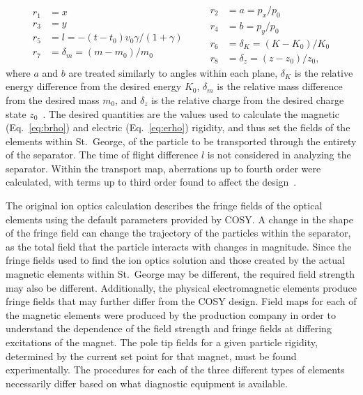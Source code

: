 \begin{equation}
    \label{eq:cosyvars}
    \begin{split}
        r_1 &= x \\
        r_3 &= y \\
        r_5 &= l = -(t - t_0)v_0\gamma/(1 + \gamma) \\
        r_7 &= \delta_m = (m - m_0)/m_0
    \end{split}
    \quad\quad
    \begin{split}
        r_2 &= a = p_x/p_0 \\
        r_4 &= b = p_y/p_0 \\
        r_6 &= \delta_K = (K - K_0)/K_0\\
        r_8 &= \delta_z = (z - z_0)/z_0,
    \end{split}
\end{equation}
where $a$ and $b$ are treated similarly to angles within each plane,
$\delta_K$ is the relative energy difference from the desired energy
$K_0$, $\delta_m$ is the relative mass difference from the desired mass
$m_0$, and $\delta_z$ is the relative charge from the desired charge
state $z_0$~\cite{COSY}. The desired quantities are the values used to
calculate the magnetic (Eq.~\ref{eq:brho}) and electric
(Eq.~\ref{eq:erho}) rigidity, and thus set the fields of the elements
within St.\ George, of the particle to be transported through the
entirety of the separator. The time of flight difference $l$ is not
considered in analyzing the separator. Within the transport map,
aberrations up to fourth order were calculated, with terms up to third
order found to affect the design~\cite{Couder2008}.

The original ion optics calculation describes the fringe fields of the
optical elements using the default parameters provided by COSY. A change
in the shape of the fringe field can change the trajectory of the
particles within the separator, as the total field that the particle
interacts with changes in magnitude. Since the fringe fields used to
find the ion optics solution and those created by the actual magnetic
elements within St.\ George may be different, the required field
strength may also be different. Additionally, the physical
electromagnetic elements produce fringe fields that may further differ
from the COSY design. Field maps for each of the magnetic elements were
produced by the production company in order to understand the dependence
of the field strength and fringe fields at differing excitations of the
magnet. The pole tip fields for a given particle rigidity, determined by
the current set point for that magnet, must be found experimentally. The
procedures for each of the three different types of elements necessarily
differ based on what diagnostic equipment is available.


